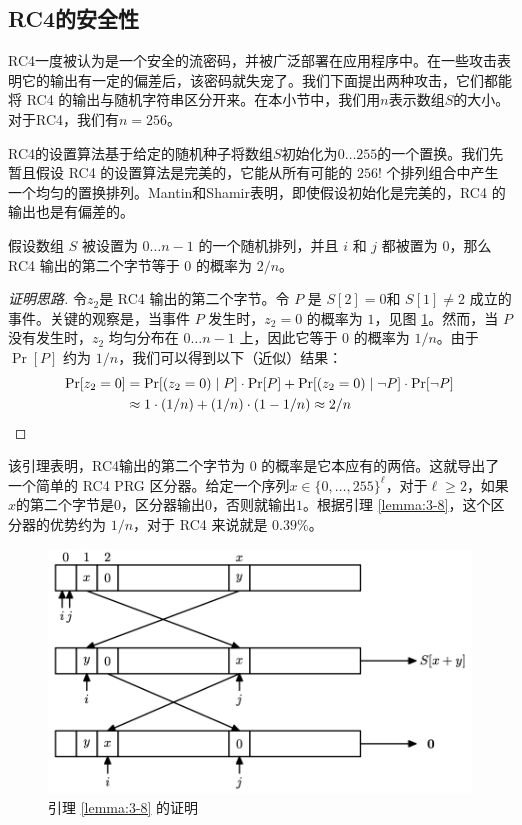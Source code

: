 \subsection{RC4的安全性}


RC4一度被认为是一个安全的流密码，并被广泛部署在应用程序中。在一些攻击表明它的输出有一定的偏差后，该密码就失宠了。我们下面提出两种攻击，它们都能将 RC4 的输出与随机字符串区分开来。在本小节中，我们用$n$表示数组$S$的大小。对于RC4，我们有$n=256$。

\begin{snote}[初始 RC4 输出中的偏差。]
RC4的设置算法基于给定的随机种子将数组$S$初始化为$0 \dots 255$的一个置换。我们先暂且假设 RC4 的设置算法是完美的，它能从所有可能的 $256!$ 个排列组合中产生一个均匀的置换排列。Mantin和Shamir表明，即使假设初始化是完美的，RC4 的输出也是有偏差的。
\end{snote}

\begin{lemma}\label{lemma:3-8}
假设数组 $S$ 被设置为 $0\dots n-1$ 的一个随机排列，并且 $i$ 和 $j$ 都被置为 $0$，那么 RC4 输出的第二个字节等于 $0$ 的概率为 $2/n$。
\end{lemma}

\begin{proof}[证明思路]
令$z_2$是 RC4 输出的第二个字节。令 $P$ 是 $S[2]=0$和 $S[1]\neq2$ 成立的事件。关键的观察是，当事件 $P$ 发生时，$z_2=0$ 的概率为 $1$，见图 \ref{fig:3-13}。然而，当 $P$ 没有发生时，$z_2$ 均匀分布在 $0\dots n-1$ 上，因此它等于 $0$ 的概率为 $1/n$。由于 $\Pr[P]$ 约为 $1/n$，我们可以得到以下（近似）结果：
\[
\begin{aligned}
\Pr[z_2=0] & =\Pr[(z_2=0)\;|\;P]\cdot\Pr[P]+\Pr[(z_2=0)\;|\;\neg P]\cdot\Pr[\neg P]\\
& \approx 1\cdot(1/n)+(1/n)\cdot(1-1/n)\approx2/n\qedhere
\end{aligned}
\]
\end{proof}

该引理表明，RC4输出的第二个字节为 $0$ 的概率是它本应有的两倍。这就导出了一个简单的 RC4 PRG 区分器。给定一个序列$x\in\{0,\dots,255\}^\ell$，对于$\ell\geq2$，如果$x$的第二个字节是$0$，区分器输出$0$，否则就输出$1$。根据引理 \ref{lemma:3-8}，这个区分器的优势约为 $1/n$，对于 RC4 来说就是 $0.39\%$。

\begin{figure}
  \centering
  \includegraphics[width=0.55\linewidth]{figures/chapter3/fig13.png}
  \caption{引理 \ref{lemma:3-8} 的证明}
  \label{fig:3-13}
\end{figure}

